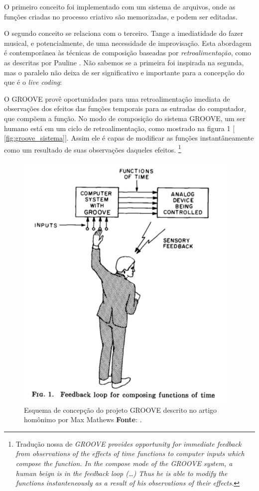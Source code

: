 O primeiro conceito foi implementado com um sistema de arquivos, onde as funções criadas no processo criativo são memorizadas, e podem ser editadas.

O segundo conceito se relaciona com o terceiro. Tange a imediatidade do fazer musical, e potencialmente, de uma necessidade de improvisação. Esta abordagem é contemporânea às técnicas de composição baseadas por \emph{retroalimentação}, como as descritas por Pauline . Não sabemos se a primeira foi inspirada na segunda, mas o paralelo não deixa de ser significativo e importante para a concepção do que é o \emph{live coding}:

\begin{citacao}
O GROOVE provê oportunidades para uma retroalimentação imediata de observações dos efeitos das funções temporais para as entradas do computador, que compõem a função. No modo de composição do sistema GROOVE, um ser humano está em um ciclo de retroalimentação, como mostrado na figura 1 $[$\autoref{fig:groove_sistema}$]$. Assim ele é capas de modificar as funções instantâneamente como um resultado de suas observações daqueles efeitos.\cite[p.~715]{mathews_groove_1970}
\footnote{Tradução nossa de \emph{GROOVE provides opportunity for immediate feedback from observations of the effects of time functions to computer inputs which compose the function. In the compose mode of the GROOVE system, a human beign is in the feedback loop (\ldots) Thus he is able to modify the functions instanteneously as a result of his observations of their effects.}}
\end{citacao}

\begin{figure}
\begin{center}
\includegraphics[scale=0.5]{./imagens/GROOVE.png}
\caption{Esquema de concepção do projeto GROOVE descrito no artigo homônimo por Max Mathews \textbf{Fonte}: \cite{mathews_groove_1970}.}
\label{fig:groove_sistema}
\end{center}
\end{figure} 

